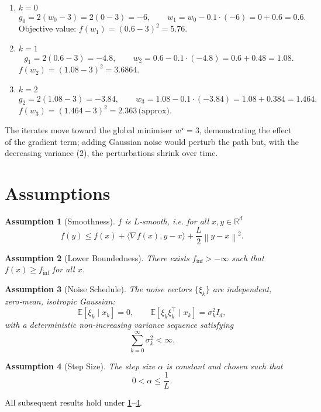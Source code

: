 \documentclass{article}
\newtheorem{assumption}{Assumption}
\newcommand{\E}{\mathbb{E}}
\newcommand{\norm}[1]{\left\lVert#1\right\rVert}
\newcommand{\ip}[2]{\langle #1,#2\rangle}
\begin{document}
\begin{enumerate}[label=Iteration \arabic*:, leftmargin=*]
\item $k=0$  
\[
g_{0}=2(w_{0}-3)=2(0-3)=-6,\qquad 
w_{1}=w_{0}-0.1\cdot(-6)=0+0.6=0.6.
\]  
Objective value: $f(w_{1})=(0.6-3)^{2}=5.76$.

\item $k=1$  
\[
g_{1}=2(0.6-3)=-4.8,\qquad 
w_{2}=0.6-0.1\cdot(-4.8)=0.6+0.48=1.08.
\]  
$f(w_{2})=(1.08-3)^{2}=3.6864$.

\item $k=2$  
\[
g_{2}=2(1.08-3)=-3.84,\qquad 
w_{3}=1.08-0.1\cdot(-3.84)=1.08+0.384=1.464.
\]  
$f(w_{3})=(1.464-3)^{2}=2.363\,\text{(approx)}$.
\end{enumerate}

The iterates move toward the global minimiser $w^{\star}=3$, demonstrating the effect of the gradient term; adding Gaussian noise would perturb the path but, with the decreasing variance (2), the perturbations shrink over time.

\newpage
\section*{Assumptions}
\begin{assumption}[Smoothness]\label{as:smooth}
$f$ is $L$‑smooth, i.e. for all $x,y\in\mathbb{R}^{d}$
\[
f(y)\le f(x)+\ip{\nabla f(x)}{y-x}+\frac{L}{2}\norm{y-x}^{2}.
\tag{A1}
\]
\end{assumption}
\begin{assumption}[Lower Boundedness]\label{as:lb}
There exists $f_{\inf}>-\infty$ such that $f(x)\ge f_{\inf}$ for all $x$.
\end{assumption}
\begin{assumption}[Noise Schedule]\label{as:noise}
The noise vectors $\{\xi_{k}\}$ are independent, zero‑mean, isotropic Gaussian:
\[
\E[\xi_{k}\mid x_{k}]=0,\qquad \E[\xi_{k}\xi_{k}^{\top}\mid x_{k}]=\sigma_{k}^{2}I_{d},
\]
with a deterministic non‑increasing variance sequence satisfying  
\[
\sum_{k=0}^{\infty}\sigma_{k}^{2}<\infty.
\tag{A3}
\]
\end{assumption}
\begin{assumption}[Step Size]\label{as:step}
The step size $\alpha$ is constant and chosen such that  
\[
0<\alpha\le \frac{1}{L}.
\tag{A4}
\]
\end{assumption}

All subsequent results hold under \ref{as:smooth}–\ref{as:step}.
\end{document}
